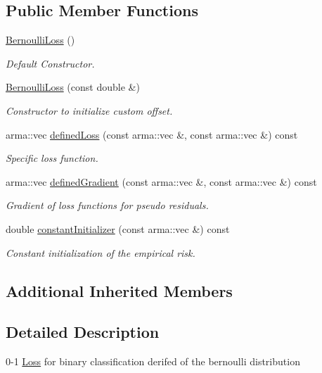 \subsection*{Public Member Functions}
\begin{DoxyCompactItemize}
\item 
\mbox{\hyperlink{classloss_1_1_bernoulli_loss_a34a87f0a059b9d7346816a20818a8ac1}{Bernoulli\+Loss}} ()
\begin{DoxyCompactList}\small\item\em Default Constructor. \end{DoxyCompactList}\item 
\mbox{\hyperlink{classloss_1_1_bernoulli_loss_afc952349e055f2cd8058015960619cc8}{Bernoulli\+Loss}} (const double \&)
\begin{DoxyCompactList}\small\item\em Constructor to initialize custom offset. \end{DoxyCompactList}\item 
arma\+::vec \mbox{\hyperlink{classloss_1_1_bernoulli_loss_a1e347cacc5a5925874f579834f421236}{defined\+Loss}} (const arma\+::vec \&, const arma\+::vec \&) const
\begin{DoxyCompactList}\small\item\em Specific loss function. \end{DoxyCompactList}\item 
arma\+::vec \mbox{\hyperlink{classloss_1_1_bernoulli_loss_a2dc644172cea3eb84f1af5aa9217c04a}{defined\+Gradient}} (const arma\+::vec \&, const arma\+::vec \&) const
\begin{DoxyCompactList}\small\item\em Gradient of loss functions for pseudo residuals. \end{DoxyCompactList}\item 
double \mbox{\hyperlink{classloss_1_1_bernoulli_loss_a1b5e26f446f30d690abc625349f563d1}{constant\+Initializer}} (const arma\+::vec \&) const
\begin{DoxyCompactList}\small\item\em Constant initialization of the empirical risk. \end{DoxyCompactList}\end{DoxyCompactItemize}
\subsection*{Additional Inherited Members}


\subsection{Detailed Description}
0-\/1 \mbox{\hyperlink{classloss_1_1_loss}{Loss}} for binary classification derifed of the bernoulli distribution 

